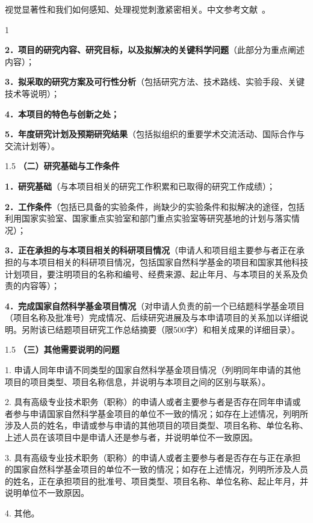\documentclass[14pt,a4paper]{extarticle}
\newcommand{\alert}[1]{\textcolor[rgb]{0.0625,0.4453,0.7383}{#1}}
\newcommand{\NsfcNote}[1]{\begin{spacing}{1.5} \alert{#1} \end{spacing}}
\newcommand{\NsfcSubNote}[1]{\alert{#1} \par}
\begin{document}
视觉显著性和我们如何感知、处理视觉刺激紧密相关。中文参考文献~\cite{huangzhiyong2011}。

{\small

\begin{spacing}{1}

\end{spacing}
}

\NsfcSubNote{\textbf{2．项目的研究内容、研究目标，以及拟解决的关键科学问题}（此部分为重点阐述内容）；}


\NsfcSubNote{\textbf{3．拟采取的研究方案及可行性分析}（包括研究方法、技术路线、实验手段、关键技术等说明）；}


\NsfcSubNote{\textbf{4．本项目的特色与创新之处；}}


\NsfcSubNote{\textbf{5．年度研究计划及预期研究结果}（包括拟组织的重要学术交流活动、国际合作与交流计划等）。}


\NsfcNote{\textbf{（二）研究基础与工作条件}}
\NsfcSubNote{\textbf{1．研究基础}（与本项目相关的研究工作积累和已取得的研究工作成绩）；}


\NsfcSubNote{\textbf{2．工作条件}（包括已具备的实验条件，尚缺少的实验条件和拟解决的途径，包括利用国家实验室、国家重点实验室和部门重点实验室等研究基地的计划与落实情况）；}


\NsfcSubNote{\textbf{3．正在承担的与本项目相关的科研项目情况}（申请人和项目组主要参与者正在承担的与本项目相关的科研项目情况，包括国家自然科学基金的项目和国家其他科技计划项目，要注明项目的名称和编号、经费来源、起止年月、与本项目的关系及负责的内容等）；}


\NsfcSubNote{\textbf{4．完成国家自然科学基金项目情况}（对申请人负责的前一个已结题科学基金项目（项目名称及批准号）完成情况、后续研究进展及与本申请项目的关系加以详细说明。另附该已结题项目研究工作总结摘要（限500字）和相关成果的详细目录）。}


\NsfcNote{\textbf{（三）其他需要说明的问题}}
\NsfcSubNote{1. 申请人同年申请不同类型的国家自然科学基金项目情况（列明同年申请的其他项目的项目类型、项目名称信息，并说明与本项目之间的区别与联系）。}


\NsfcSubNote{2. 具有高级专业技术职务（职称）的申请人或者主要参与者是否存在同年申请或者参与申请国家自然科学基金项目的单位不一致的情况；如存在上述情况，列明所涉及人员的姓名，申请或参与申请的其他项目的项目类型、项目名称、单位名称、上述人员在该项目中是申请人还是参与者，并说明单位不一致原因。}


\NsfcSubNote{3. 具有高级专业技术职务（职称）的申请人或者主要参与者是否存在与正在承担的国家自然科学基金项目的单位不一致的情况；如存在上述情况，列明所涉及人员的姓名，正在承担项目的批准号、项目类型、项目名称、单位名称、起止年月，并说明单位不一致原因。}


\NsfcSubNote{4. 其他。}
\end{document}
